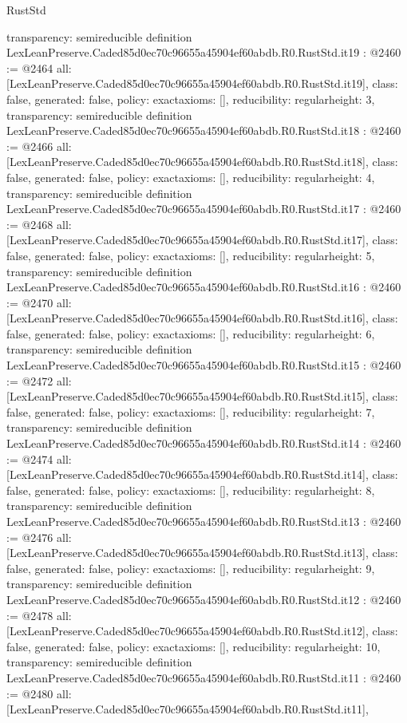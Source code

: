 \begin{lexlean}{RustStd}
\begin{coremodule}
{  transparency: semireducible
}
definition LexLeanPreserve.Caded85d0ec70c96655a45904ef60abdb.R0.RustStd.it19 : @2460 := @2464 {
  all: [LexLeanPreserve.Caded85d0ec70c96655a45904ef60abdb.R0.RustStd.it19],
  class: false,
  generated: false,
  policy: exact{axioms: []},
  reducibility: regular{height: 3},
  transparency: semireducible
}
definition LexLeanPreserve.Caded85d0ec70c96655a45904ef60abdb.R0.RustStd.it18 : @2460 := @2466 {
  all: [LexLeanPreserve.Caded85d0ec70c96655a45904ef60abdb.R0.RustStd.it18],
  class: false,
  generated: false,
  policy: exact{axioms: []},
  reducibility: regular{height: 4},
  transparency: semireducible
}
definition LexLeanPreserve.Caded85d0ec70c96655a45904ef60abdb.R0.RustStd.it17 : @2460 := @2468 {
  all: [LexLeanPreserve.Caded85d0ec70c96655a45904ef60abdb.R0.RustStd.it17],
  class: false,
  generated: false,
  policy: exact{axioms: []},
  reducibility: regular{height: 5},
  transparency: semireducible
}
definition LexLeanPreserve.Caded85d0ec70c96655a45904ef60abdb.R0.RustStd.it16 : @2460 := @2470 {
  all: [LexLeanPreserve.Caded85d0ec70c96655a45904ef60abdb.R0.RustStd.it16],
  class: false,
  generated: false,
  policy: exact{axioms: []},
  reducibility: regular{height: 6},
  transparency: semireducible
}
definition LexLeanPreserve.Caded85d0ec70c96655a45904ef60abdb.R0.RustStd.it15 : @2460 := @2472 {
  all: [LexLeanPreserve.Caded85d0ec70c96655a45904ef60abdb.R0.RustStd.it15],
  class: false,
  generated: false,
  policy: exact{axioms: []},
  reducibility: regular{height: 7},
  transparency: semireducible
}
definition LexLeanPreserve.Caded85d0ec70c96655a45904ef60abdb.R0.RustStd.it14 : @2460 := @2474 {
  all: [LexLeanPreserve.Caded85d0ec70c96655a45904ef60abdb.R0.RustStd.it14],
  class: false,
  generated: false,
  policy: exact{axioms: []},
  reducibility: regular{height: 8},
  transparency: semireducible
}
definition LexLeanPreserve.Caded85d0ec70c96655a45904ef60abdb.R0.RustStd.it13 : @2460 := @2476 {
  all: [LexLeanPreserve.Caded85d0ec70c96655a45904ef60abdb.R0.RustStd.it13],
  class: false,
  generated: false,
  policy: exact{axioms: []},
  reducibility: regular{height: 9},
  transparency: semireducible
}
definition LexLeanPreserve.Caded85d0ec70c96655a45904ef60abdb.R0.RustStd.it12 : @2460 := @2478 {
  all: [LexLeanPreserve.Caded85d0ec70c96655a45904ef60abdb.R0.RustStd.it12],
  class: false,
  generated: false,
  policy: exact{axioms: []},
  reducibility: regular{height: 10},
  transparency: semireducible
}
definition LexLeanPreserve.Caded85d0ec70c96655a45904ef60abdb.R0.RustStd.it11 : @2460 := @2480 {
  all: [LexLeanPreserve.Caded85d0ec70c96655a45904ef60abdb.R0.RustStd.it11],
}
\end{coremodule}
\end{lexlean}
